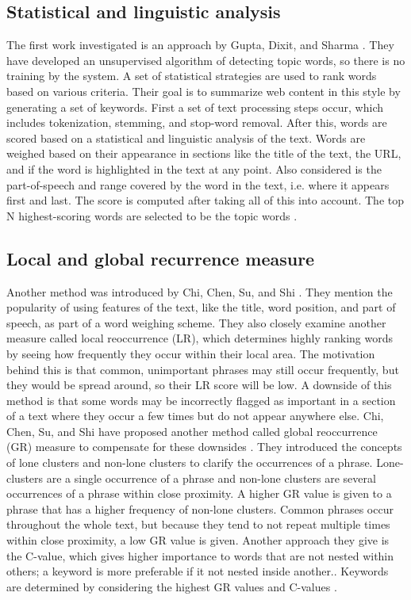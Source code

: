 \documentclass[11pt,titlepage]{report}
\begin{document}
\subsection{Statistical and linguistic analysis}
The first work investigated is an approach by Gupta, Dixit, and Sharma \cite{gupta}. They have developed an unsupervised algorithm of detecting topic words, so there is no training by the system. A set of statistical strategies are used to rank words based on various criteria. Their goal is to summarize web content in this style by generating a set of keywords. First a set of text processing steps occur, which includes tokenization, stemming, and stop-word removal. After this, words are scored based on a statistical and linguistic analysis of the text. Words are weighed based on their appearance in sections like the title of the text, the URL, and if the word is highlighted in the text at any point. Also considered is the part-of-speech and range covered by the word in the text, i.e. where it appears first and last. The score is computed after taking all of this into account. The top N highest-scoring words are selected to be the topic words \cite{gupta}. 
\subsection{Local and global recurrence measure}
Another method was introduced by Chi, Chen, Su, and Shi \cite{sushi}. They mention the popularity of using features of the text, like the title, word position, and part of speech, as part of a word weighing scheme. They also closely examine another measure called local reoccurrence (LR), which determines highly ranking words by seeing how frequently they occur within their local area. The motivation behind this is that common, unimportant phrases may still occur frequently, but they would be spread around, so their LR score will be low. A downside of this method is that some words may be incorrectly flagged as important in a section of a text where they occur a few times but do not appear anywhere else. Chi, Chen, Su, and Shi have proposed another method called global reoccurrence (GR) measure to compensate for these downsides \cite{sushi}. They introduced the concepts of lone clusters and non-lone clusters to clarify the occurrences of a phrase. Lone-clusters are a single occurrence of a phrase and non-lone clusters are several occurrences of a phrase within close proximity. A higher GR value is given to a phrase that has a higher frequency of non-lone clusters. Common phrases occur throughout the whole text, but because they tend to not repeat multiple times within close proximity, a low GR value is given. Another approach they give is the C-value, which gives higher importance to words that are not nested within others; a keyword is more preferable if it not nested inside another.. Keywords are determined by considering the highest GR values and C-values \cite{sushi}.
\end{document}
